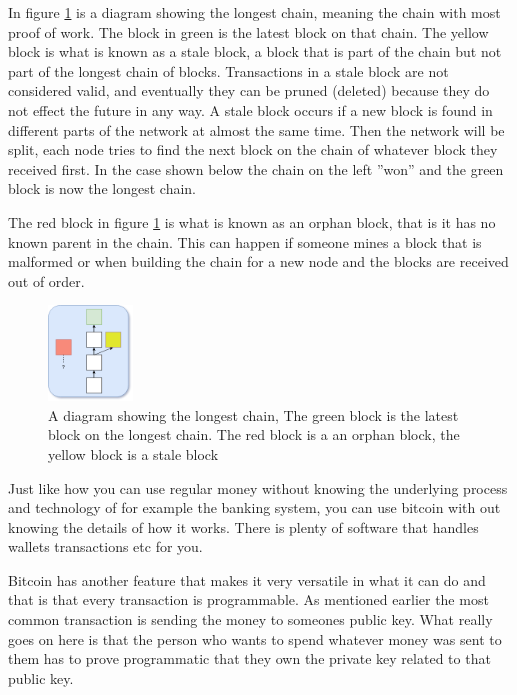 In figure \ref{fig:blockchain2} is a diagram showing the longest chain, meaning the chain with most proof of work. The block in green is the latest block on that chain. The yellow block is what is known as a stale block, a block that is part of the chain but not part of the longest chain of blocks. Transactions in a stale block are not considered valid, and eventually they can be pruned (deleted) because they do not effect the future in any way. A stale block occurs if a new block is found in different parts of the network at almost the same time. Then the network will be split, each node tries to find the next block on the chain of whatever block they received first. In the case shown below the chain on the left ''won'' and the green block is now the longest chain.

The red block in figure \ref{fig:blockchain2} is what is known as an orphan block, that is it has no known parent in the chain. This can happen if someone mines a block that is malformed or when building the chain for a new node and the blocks are received out of order.

\begin{figure}[H]
	\centering
	\includegraphics[width=0.2\textwidth]{introduction/images/more_blockchain.png}
	\caption{A diagram showing the longest chain, The green block is the latest block on the longest chain. The red block is a an orphan block, the yellow block is a stale block}
	\label{fig:blockchain2}
\end{figure}


Just like how you can use regular money without knowing the underlying process and technology of for example the banking system, you can use bitcoin with out knowing the details of how it works. There is plenty of software that handles wallets transactions etc for you. 

Bitcoin has another feature that makes it very versatile in what it can do and that is that every transaction is programmable. As mentioned earlier the most common transaction is sending the money to someones public key. What really goes on here is that the person who wants to spend whatever money was sent to them has to prove programmatic that they own the private key related to that public key. 


